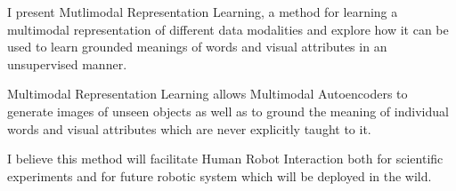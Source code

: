 I present Mutlimodal Representation Learning, a method for learning a multimodal representation of different data modalities and explore how it can be used to learn grounded meanings of words and visual attributes in an unsupervised manner.

Multimodal Representation Learning allows Multimodal Autoencoders to generate images of unseen objects as well as to ground the meaning of individual words and visual attributes which are never explicitly taught to it. 

I believe this method will facilitate Human Robot Interaction both for scientific experiments and for future robotic system which will be deployed in the wild.

